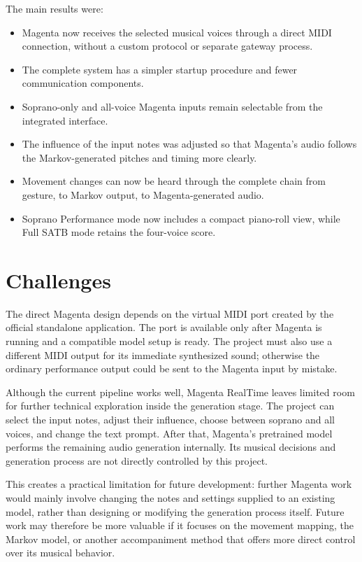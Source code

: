 \documentclass[11pt,a4paper]{article}
\begin{document}
The main results were:

\begin{itemize}
    \item Magenta now receives the selected musical voices through a direct
    MIDI connection, without a custom protocol or separate gateway process.
    \item The complete system has a simpler startup procedure and fewer
    communication components.
    \item Soprano-only and all-voice Magenta inputs remain selectable from the
    integrated interface.
    \item The influence of the input notes was adjusted so that Magenta's audio
    follows the Markov-generated pitches and timing more clearly.
    \item Movement changes can now be heard through the complete chain from
    gesture, to Markov output, to Magenta-generated audio.
    \item Soprano Performance mode now includes a compact piano-roll view,
    while Full SATB mode retains the four-voice score.
\end{itemize}

\section{Challenges}

The direct Magenta design depends on the virtual MIDI port created by the
official standalone application. The port is available only after Magenta is
running and a compatible model setup is ready. The project must also use a
different MIDI output for its immediate synthesized sound; otherwise the
ordinary performance output could be sent to the Magenta input by mistake.

Although the current pipeline works well, Magenta RealTime leaves limited room
for further technical exploration inside the generation stage. The project can
select the input notes, adjust their influence, choose between soprano and all
voices, and change the text prompt. After that, Magenta's pretrained model
performs the remaining audio generation internally. Its musical decisions and
generation process are not directly controlled by this project.

This creates a practical limitation for future development: further Magenta
work would mainly involve changing the notes and settings supplied to an
existing model, rather than designing or modifying the generation process
itself. Future work may therefore be more valuable if it focuses on the
movement mapping, the Markov model, or another accompaniment method that
offers more direct control over its musical behavior.
\end{document}
